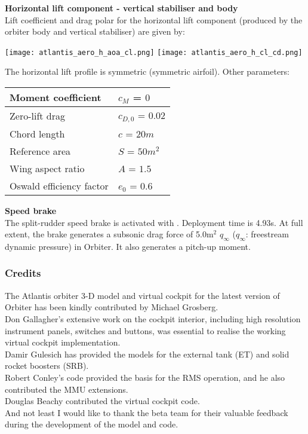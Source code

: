 \documentclass[Orbiter User Manual.tex]{subfiles}
\begin{document}
\textbf{\large Horizontal lift component - vertical stabiliser and body}\\

Lift coefficient and drag polar for the horizontal lift component (produced by the orbiter body and vertical stabiliser) are given by:

\texttt{[image: atlantis\_aero\_h\_aoa\_cl.png]}
\texttt{[image: atlantis\_aero\_h\_cl\_cd.png]}

The horizontal lift profile is symmetric (symmetric airfoil). Other parameters:

\begin{table}[H]
\centering
\begin{tabular}{|l|l|}
\hline
Moment coefficient & $c_M$ = $0$ \\ \hline
Zero-lift drag & $c_{D,0}$ = $0.02$ \\ \hline
Chord length & $c$ = $20 m$ \\ \hline
Reference area & $S$ = $50 m^2$ \\ \hline
Wing aspect ratio & $A$ = $1.5$ \\ \hline
Oswald efficiency factor & $e_0$ = $0.6$ \\ \hline
\end{tabular}
\end{table}

\textbf{\large Speed brake}\\

The split-rudder speed brake is activated with . Deployment time is 4.93s. At full extent, the brake generates a subsonic drag force of 5.0m$^{2}$ $q_\infty$ ($q_\infty$: freestream dynamic pressure) in Orbiter. It also generates a pitch-up moment.

\subsubsection{Credits}
The Atlantis orbiter 3-D model and virtual cockpit for the latest version of Orbiter has been kindly contributed by Michael Grosberg.\\

Don Gallagher's extensive work on the cockpit interior, including high resolution instrument panels, switches and buttons, was essential to realise the working virtual cockpit implementation.\\

Damir Gulesich has provided the models for the external tank (ET) and solid rocket boosters (SRB).\\

Robert Conley's code provided the basis for the RMS operation, and he also contributed the MMU extensions.\\

Douglas Beachy contributed the virtual cockpit code.\\

And not least I would like to thank the beta team for their valuable feedback during the development of the model and code.
\end{document}
